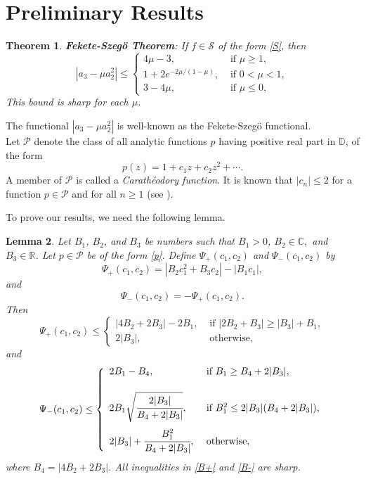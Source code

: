 \documentclass[a4paper,12pt]{amsart}
\newtheorem{theorem}{Theorem}[section]
\newtheorem{lemma}[theorem]{Lemma}
\theoremstyle{definition}
\numberwithin{equation}{section}
\begin{document}
\section{Preliminary Results}

\begin{theorem}{\textbf{Fekete-Szegö Theorem}}\cite{feketo}:
 If $f \in \mathcal{S}$ of the form \eqref{S}, then 
\begin{equation*}
|a_3-\mu a_2^2|\le\left \{
	\begin{array}{ll}
		4\mu-3, & {\mbox{ if }} \mu \geq 1,
		\\[2mm]
		1+2e^{-2\mu/(1-\mu)}, & {\mbox{ if }} 0 < \mu < 1,\\[2mm]
		3-4\mu, &{\mbox{ if}} \,\,   \mu \leq 0,
	\end{array}
	\right.
\end{equation*}
This bound is sharp for each $\mu$.
\end{theorem}
\noindent The functional $|a_3-\mu a_2^2|$ is well-known as the
Fekete-Szegö functional.\\


\noindent Let $\mathcal{P}$ denote the class of all analytic functions $p$ having positive real part in $\mathbb{D}$, of the form
\begin{equation}\label{p}
p(z)=1+c_1z+c_2z^2+\cdots.
\end{equation}
A member of $\mathcal{P}$ is called a {\em Carath\'{e}odory function}. It is known that $|c_n|\le 2$ for a function $p\in \mathcal{P}$ and for all $n\ge 1$ (see \cite{Dur83}).

\medskip

To prove our results, we need the following lemma.

\medskip

\begin{lemma}\cite{SimT20}\label{lemma2}
Let $B_1$, $B_2$, and $B_3$ be numbers such that $B_1>0$, $B_2\in \mathbb{C},$ and $B_3\in \mathbb{R}$. Let $p\in \mathcal{P}$ be of the form \eqref{p}. Define $\Psi_+(c_1,c_2)$ and $\Psi_-(c_1,c_2)$ by
$$
\Psi_+(c_1,c_2)=|B_2c_1^2+B_3c_2|-|B_1c_1|,
$$
and 
$$
\Psi_-(c_1,c_2)=-\Psi_+(c_1,c_2).
$$
Then
\begin{equation}\label{B+}
\Psi_+(c_1,c_2)\le\left \{
	\begin{array}{ll}
		|4B_2+2B_3|-2B_1, & {\mbox{ if }} |2B_2+B_3|\ge |B_3|+B_1,
		\\[5mm]
		2|B_3|, & {\mbox{ otherwise}},
	\end{array}
	\right.
\end{equation}
and
\begin{equation}\label{B-}
	\Psi_-(c_1,c_2)\le\left \{
	\begin{array}{ll}
		2B_1-B_4, & {\mbox{ if }} B_1\ge B_4+2|B_3|,
		\\[5mm]
		2B_1\sqrt{\cfrac{2|B_3|}{B_4+2|B_3|}}, & {\mbox{ if }} B_1^2\le 2|B_3|(B_4+2|B_3|),\\[5mm]
		2|B_3|+\cfrac{B_1^2}{B_4+2|B_3|}, &{\mbox{ otherwise}},
	\end{array}
	\right.
\end{equation}
where $B_4=|4B_2+2B_3|$. All inequalities in \eqref{B+} and \eqref{B-} are sharp.
\end{lemma}
\end{document}
